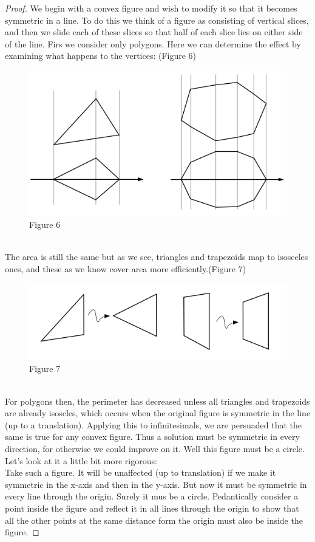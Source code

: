 \documentclass[12pt, a4paper, titlepage]{article}
\begin{document}
\begin{proof}
We begin with a convex figure and wish to modify it so that it becomes symmetric in a line. To do this we think of a figure as consisting of vertical slices, and then we slide each of these slices so that half of each slice lies on either side of the line. Firs we consider only polygons. Here we can determine the effect by examining what happens to the vertices: (Figure 6)\\
\begin{figure}[h]
\includegraphics[scale=0.5]{images/Figure6}
\centering
Figure 6
\centering
\end{figure}
\\
The area is still the same but as we see, triangles and trapezoids map to isosceles ones, and these as we know cover area more efficiently.(Figure 7)\\
\begin{figure}[h]
\includegraphics[scale=0.5]{images/Figure7}
\centering
Figure 7
\centering
\end{figure}
\\
For polygons then, the perimeter has decreased unless all triangles and trapezoids are already isoscles, which occurs when the original figure is symmetric in the line (up to a translation). Applying this to infinitesimals, we are persuaded that the same is true for any convex figure. Thus a solution must be symmetric in every direction, for otherwise we could improve on it. Well this figure must be a circle. Let's look at it a little bit more rigorous:\\
Take such a figure. It will be unaffected (up to translation) if we make it symmetric in the x-axis and then in the y-axis. But now it must be symmetric in every line through the origin. Surely it mus be a circle. Pedantically consider a point inside the figure and reflect it in all lines through the origin to show that all the other points at the same distance form the origin must also be inside the figure.

\end{proof}
\end{document}
